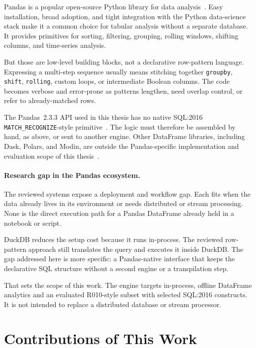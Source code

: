 Pandas is a popular open-source Python library for data
analysis~\cite{McKinney2010}.  Easy installation, broad adoption, and
tight integration with the Python data-science stack make it a common
choice for tabular analysis without a separate database.
It provides primitives for sorting, filtering, grouping, rolling
windows, shifting columns, and time-series analysis.

But those are low-level building blocks, not a declarative row-pattern
language.  Expressing a multi-step sequence usually means stitching
together \texttt{groupby}, \texttt{shift}, \texttt{rolling}, custom
loops, or intermediate Boolean columns.  The code becomes verbose and
error-prone as patterns lengthen, need overlap control, or refer to
already-matched rows.

The Pandas~2.3.3 API used in this thesis has no native SQL:2016
\texttt{MATCH\_RECOGNIZE}-style primitive~\cite{pandas233api}.  The
logic must therefore be assembled by hand, as above, or sent to
another engine.
Other DataFrame libraries, including Dask, Polars, and Modin, are
outside the Pandas-specific implementation and evaluation scope of
this thesis~\cite{Evaluation}.

\paragraph{Research gap in the Pandas ecosystem.}
\label{subsec:related-gap-synthesis}
The reviewed systems expose a deployment and workflow gap.  Each fits
when the data already lives in its environment or needs distributed or
stream processing.  None is the direct execution path for a Pandas
DataFrame already held in a notebook or script.

DuckDB reduces the setup cost because it runs in-process.  The reviewed
row-pattern approach still translates the query and executes it inside
DuckDB.  The gap addressed here is more specific: a Pandas-native
interface that keeps the declarative SQL structure without a second
engine or a transpilation step.

That sets the scope of this work.  The engine targets in-process,
offline DataFrame analytics and an evaluated R010-style subset with
selected SQL:2016 constructs.  It is not intended to replace a
distributed database or stream processor.

\section{Contributions of This Work}
\label{sec:related-contribution}

